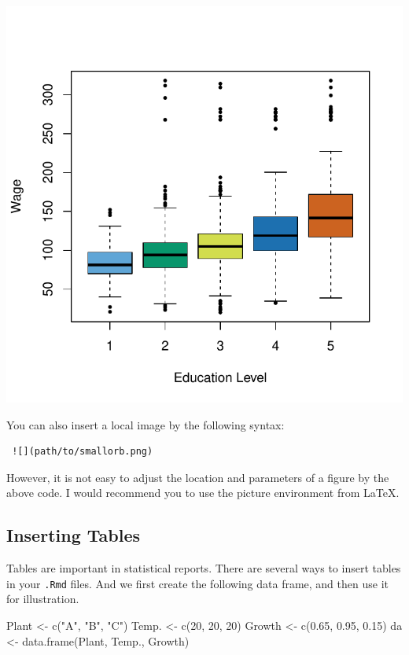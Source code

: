 \documentclass[
  11pt,
]{article}
\newenvironment{Shaded}{\begin{snugshade}}{\end{snugshade}}
\newcommand{\DecValTok}[1]{\textcolor[rgb]{0.00,0.00,0.81}{#1}}
\newcommand{\FloatTok}[1]{\textcolor[rgb]{0.00,0.00,0.81}{#1}}
\newcommand{\FunctionTok}[1]{\textcolor[rgb]{0.00,0.00,0.00}{#1}}
\newcommand{\NormalTok}[1]{#1}
\newcommand{\OtherTok}[1]{\textcolor[rgb]{0.56,0.35,0.01}{#1}}
\newcommand{\StringTok}[1]{\textcolor[rgb]{0.31,0.60,0.02}{#1}}
\begin{document}
\begin{center}\includegraphics{lab_1_files/figure-latex/unnamed-chunk-2-1} \end{center}

You can also insert a local image by the following syntax:

\begin{verbatim}
 ![](path/to/smallorb.png)
\end{verbatim}

However, it is not easy to adjust the location and parameters of a
figure by the above code. I would recommend you to use the picture
environment from \LaTeX.

\hypertarget{inserting-tables}{%
\subsection{Inserting Tables}\label{inserting-tables}}

Tables are important in statistical reports. There are several ways to
insert tables in your \texttt{.Rmd} files. And we first create the
following data frame, and then use it for illustration.

\begin{Shaded}
\begin{Highlighting}[]
\NormalTok{Plant }\OtherTok{\textless{}{-}} \FunctionTok{c}\NormalTok{(}\StringTok{"A"}\NormalTok{, }\StringTok{"B"}\NormalTok{, }\StringTok{"C"}\NormalTok{)}
\NormalTok{Temp. }\OtherTok{\textless{}{-}} \FunctionTok{c}\NormalTok{(}\DecValTok{20}\NormalTok{, }\DecValTok{20}\NormalTok{, }\DecValTok{20}\NormalTok{)}
\NormalTok{Growth }\OtherTok{\textless{}{-}} \FunctionTok{c}\NormalTok{(}\FloatTok{0.65}\NormalTok{, }\FloatTok{0.95}\NormalTok{, }\FloatTok{0.15}\NormalTok{)}
\NormalTok{da }\OtherTok{\textless{}{-}} \FunctionTok{data.frame}\NormalTok{(Plant, Temp., Growth)}
\end{Highlighting}
\end{Shaded}
\end{document}
